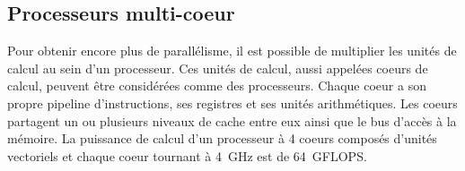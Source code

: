 \subsection{Processeurs multi-coeur}
Pour obtenir encore plus de parallélisme, il est possible de multiplier les unités de calcul au sein d'un processeur.
%
Ces unités de calcul, aussi appelées coeurs de calcul, peuvent être considérées comme des processeurs.
%
Chaque coeur a son propre pipeline d'instructions, ses registres et ses unités arithmétiques.
%
Les coeurs partagent un ou plusieurs niveaux de cache entre eux ainsi que le bus d'accès à la mémoire.
%
La puissance de calcul d'un processeur à 4 coeurs composés d'unités vectoriels et chaque coeur tournant à 4~GHz est de 64~GFLOPS.
